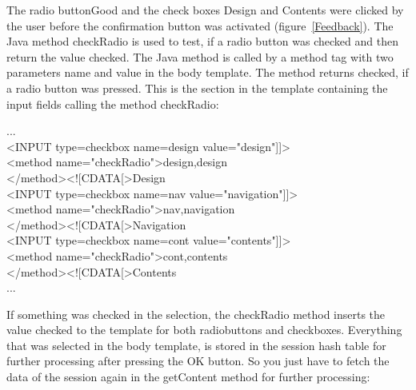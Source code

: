 The radio button{\name Good} and the check boxes {\name Design} and {\name Contents} were
clicked by the user before the confirmation button was activated (figure~\ref{Feedback}).
The Java method {\meth checkRadio} is used to test, if a radio button was
checked and then return the value {\name checked}. The Java method  is called
by a method tag with two parameters name and value in the body template.
The method returns {\name checked}, if  a radio button was pressed. This is
the section in the template containing the input fields calling the
method {\meth checkRadio}:

\begin{java}
...\\
<INPUT type=checkbox name=design value="design"]]>\\
<method name="checkRadio">design,design\\
</method><![CDATA[>Design\\
<INPUT type=checkbox name=nav value="navigation"]]>\\
<method name="checkRadio">nav,navigation\\
</method><![CDATA[>Navigation\\
<INPUT type=checkbox name=cont value="contents"]]>\\
<method name="checkRadio">cont,contents\\
</method><![CDATA[>Contents\\
...\\
\end{java}

If something was checked in the selection, the {\meth checkRadio} method
inserts the value {\name checked} to the template for both radiobuttons and
checkboxes. Everything that was selected in the body template, is stored
in the session hash table for further processing after pressing the OK
button. So you just have to fetch the data of the session again in the
{\meth getContent} method for further processing:

